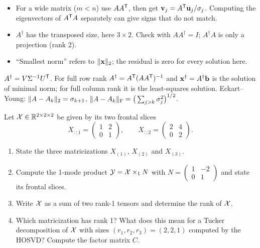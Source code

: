 \begin{solution}
\begin{trap}
\begin{itemize}
\item For a wide matrix ($m<n$) use $AA^{\mathsf{T}}$, then get $\mathbf{v}_j=A^{\mathsf{T}}\mathbf{u}_j/\sigma_j$. Computing the eigenvectors of $A^{\mathsf{T}} A$ separately can give signs that do not match.
\item $A^\dagger$ has the transposed size, here $3\times2$. Check with $AA^\dagger=I$; $A^\dagger A$ is only a projection (rank 2).
\item ``Smallest norm'' refers to $\lVert \mathbf{x}\rVert_2$; the residual is zero for every solution here.
\end{itemize}
\end{trap}
\begin{heart}
$A^\dagger=V\Sigma^{-1}U^{\mathsf{T}}$. For full row rank $A^\dagger=A^{\mathsf{T}}(AA^{\mathsf{T}})^{-1}$ and $\mathbf{x}^\dagger=A^\dagger\mathbf{b}$ is the solution of minimal norm; for full column rank it is the least-squares solution. Eckart--Young: $\lVert A-A_k\rVert_2=\sigma_{k+1}$, $\lVert A-A_k\rVert_{\mathrm F}=\big(\sum_{j>k}\sigma_j^2\big)^{1/2}$.
\end{heart}
\end{solution}

Let $\mathcal{X}\in\mathbb{R}^{2\times2\times2}$ be given by its two frontal slices
\[
X_{::1}=\begin{pmatrix}1&2\\0&1\end{pmatrix},\qquad X_{::2}=\begin{pmatrix}2&4\\0&2\end{pmatrix}.
\]
\begin{enumerate}
\item State the three matricizations $X_{(1)}$, $X_{(2)}$ and $X_{(3)}$.
\item Compute the 1-mode product $\mathcal{Y}=\mathcal{X}\times_1 N$ with $N=\begin{pmatrix}1&-2\\0&1\end{pmatrix}$ and state its frontal slices.
\item Write $\mathcal{X}$ as a sum of two rank-1 tensors and determine the rank of $\mathcal{X}$.
\item Which matricization has rank 1? What does this mean for a Tucker decomposition of $\mathcal{X}$ with sizes $(r_1,r_2,r_3)=(2,2,1)$ computed by the HOSVD? Compute the factor matrix $C$.
\end{enumerate}

